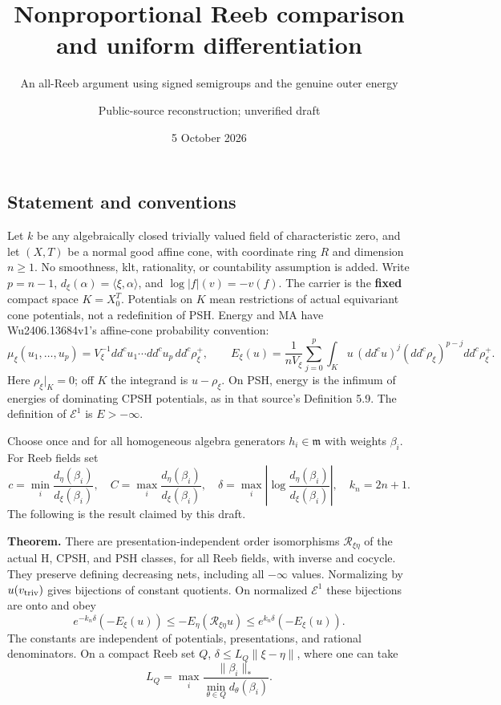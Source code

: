 \documentclass[
  10pt,
]{article}
\title{Nonproportional Reeb comparison and uniform differentiation}
\subtitle{An all-Reeb argument using signed semigroups and the genuine
outer energy}
\author{Public-source reconstruction; unverified draft}
\date{5 October 2026}
\begin{document}
\maketitle

\subsection{Statement and conventions}\label{statement-and-conventions}

Let \(k\) be any algebraically closed trivially valued field of
characteristic zero, and let \((X,T)\) be a normal good affine cone,
with coordinate ring \(R\) and dimension \(n\geq1\). No smoothness, klt,
rationality, or countability assumption is added. Write \(p=n-1\),
\(d_\xi(\alpha)=\langle\xi,\alpha\rangle\), and \(\log|f|(v)=-v(f)\).
The carrier is the \textbf{fixed} compact space \(K=X_0^T\). Potentials
on \(K\) mean restrictions of actual equivariant cone potentials, not a
redefinition of PSH. Energy and MA have Wu2406.13684v1's affine-cone
probability convention: \[
 \mu_\xi(u_1,\ldots,u_p)=V_\xi^{-1}dd^cu_1\cdots dd^cu_p\,dd^c\rho_\xi^+,
 \qquad
 E_\xi(u)=\frac1{nV_\xi}\sum_{j=0}^p\int_Ku\,(dd^cu)^j(dd^c\rho_\xi)^{p-j}dd^c\rho_\xi^+ .       \tag{1}
\] Here \(\rho_\xi|_K=0\); off \(K\) the integrand is \(u-\rho_\xi\). On
PSH, energy is the infimum of energies of dominating CPSH potentials, as
in that source's Definition 5.9. The definition of \(\mathcal E^1\) is
\(E> -\infty\).

Choose once and for all homogeneous algebra generators
\(h_i\in\mathfrak m\) with weights \(\beta_i\). For Reeb fields set \[
 c=\min_i\frac{d_\eta(\beta_i)}{d_\xi(\beta_i)},\quad C=\max_i\frac{d_\eta(\beta_i)}{d_\xi(\beta_i)},\quad
 \delta=\max_i\left|\log\frac{d_\eta(\beta_i)}{d_\xi(\beta_i)}\right|,\quad k_n=2n+1.                     \tag{2}
\] The following is the result claimed by this draft.

\textbf{Theorem.} There are presentation-independent order isomorphisms
\(\mathcal R_{\xi\eta}\) of the actual H, CPSH, and PSH classes, for all
Reeb fields, with inverse and cocycle. They preserve defining decreasing
nets, including all \(-\infty\) values. Normalizing by
\(u(v_{\rm triv})\) gives bijections of constant quotients. On
normalized \(\mathcal E^1\) these bijections are onto and obey \[
 e^{-k_n\delta}(-E_\xi(u))\leq-E_\eta(\mathcal R_{\xi\eta}u)\leq e^{k_n\delta}(-E_\xi(u)).                  \tag{3}
\] The constants are independent of potentials, presentations, and
rational denominators. On a compact Reeb set \(Q\),
\(\delta\leq L_Q\|\xi-\eta\|\), where one can take
\[ L_Q=\max_i\frac{\|\beta_i\|_*}{\min_{\theta\in Q}d_\theta(\beta_i)}. \]
\end{document}
